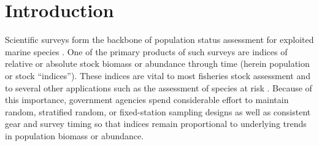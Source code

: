 \documentclass[12pt]{article}
\begin{document}
%

\section*{Introduction}

Scientific surveys form the backbone of population status assessment for exploited marine species \citep[e.g.,][]{doubleday1981, hilbornwalters1992, gunderson1993}. One of the primary products of such surveys are indices of relative or absolute stock biomass or abundance through time (herein population or stock ``indices''). These indices are vital to most fisheries stock assessment \citep{hilbornwalters1992} and to several other applications such as the assessment of species at risk \citep{iucn2012}. Because of this importance, government agencies spend considerable effort to maintain random, stratified random, or fixed-station sampling designs as well as consistent gear and survey timing so that indices remain proportional to underlying trends in population biomass or abundance.
\end{document}
